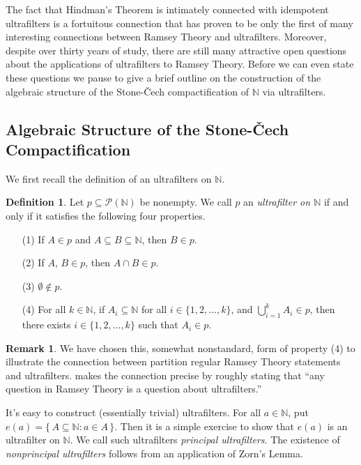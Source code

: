 \documentclass[12pt]{article}
\theoremstyle{plain}
\theoremstyle{definition}
\newtheorem{defn}[thm]{Definition}
\newtheorem{rmk}[thm]{Remark}
\newcommand{\bbN}{\mathbb{N}}
\begin{document}
The fact that Hindman's Theorem is intimately connected with
idempotent ultrafilters is a fortuitous connection that has proven to
be only the first of many interesting connections between Ramsey
Theory and ultrafilters.
Moreover, despite over thirty years of study, there are still many
attractive open questions about the applications of ultrafilters to
Ramsey Theory. 
Before we can even state these questions we pause to give a brief
outline on the construction of the algebraic structure of the
Stone-\v{C}ech compactification of $\bbN$ via ultrafilters.

\subsection{Algebraic Structure of the Stone-\v{C}ech Compactification}
We first recall the definition of an ultrafilters on $\bbN$.
  \begin{defn}
    \label{defn:uf}
    Let $p \subseteq \mathcal{P}(\bbN)$ be nonempty.
    We call $p$ an \textsl{ultrafilter on $\bbN$} if and only if it
    satisfies the following four properties.
      \begin{itemize}
        \item[(1)] If $A \in p$ and $A \subseteq B \subseteq \bbN$,
          then $B \in p$.
        \item[(2)] If $A$, $B \in p$, then $A \cap B \in p$.
        \item[(3)] $\emptyset \not\in p$.
        \item[(4)] For all $k \in \bbN$, if $A_i \subseteq \bbN$ for
          all $i \in \{1, 2, \ldots, k\}$, and $\bigcup_{i=1}^k A_i
          \in p$, then there exists $i \in \{1, 2, \ldots, k\}$ such
          that $A_i \in p$.
      \end{itemize}
  \end{defn}
  \begin{rmk}
    We have chosen this, somewhat nonstandard, form of property (4) to
    illustrate the connection between partition regular Ramsey Theory
    statements and ultrafilters.
    \cite[Theorem 5.7]{Hindman:1998fk} makes the connection precise by
    roughly stating that ``any question in Ramsey Theory is a question
    about ultrafilters.''
  \end{rmk}

It's easy to construct (essentially trivial) ultrafilters. 
For all $a \in \bbN$, put $e(a) = \{\, A \subseteq \bbN : a \in A
\,\}$.
Then it is a simple exercise to show that $e(a)$ is an ultrafilter on
$\bbN$. 
We call such ultrafilters \textsl{principal ultrafilters}. 
The existence of \textsl{nonprincipal ultrafilters} follows from an
application of Zorn's Lemma. 
\end{document}
